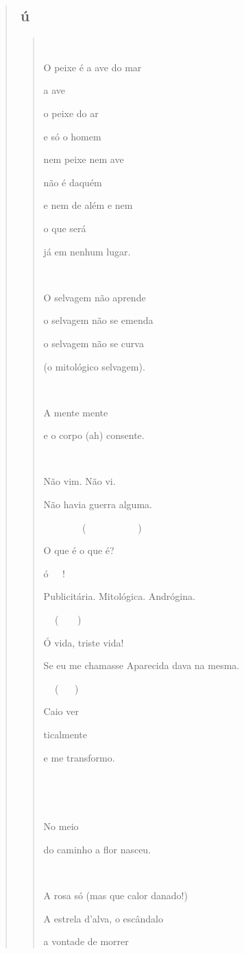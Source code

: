 \begin{verse}
\subsection{ú}\label{section-5}

\begin{quote}


O peixe é a ave do mar

a ave

o peixe do ar

e só o homem

nem peixe nem ave

não é daquém

e nem de além e nem

o que será

já em nenhum lugar.

 

O selvagem não aprende

o selvagem não se emenda

o selvagem não se curva

(o mitológico selvagem).



A mente mente

e o corpo (ah) consente.

 

Não vim. Não vi.

Não havia guerra alguma.

  (  )

O que é o que é?

ó !

Publicitária. Mitológica. Andrógina.

 ()

Ó vida, triste vida!

Se eu me chamasse Aparecida dava na mesma.

 ()

Caio ver

ticalmente

e me transformo.





No meio

do caminho a flor nasceu.



A rosa só (mas que calor danado!)

A estrela d'alva, o escândalo

a vontade de morrer


\end{quote}
\end{verse}
